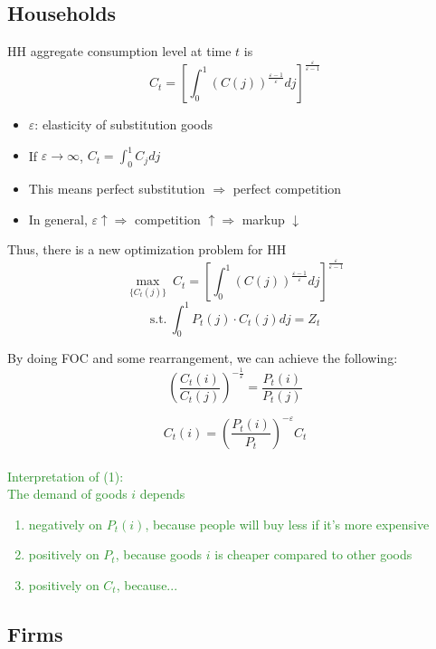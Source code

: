 \documentclass{article}
\begin{document}
\subsection{Households}
HH aggregate consumption level at time $t$ is 
$$C_t = \left [\int_0^1 (C(j))^{\frac{\varepsilon-1}{\varepsilon}}dj \right]^{\frac{\varepsilon}{\varepsilon - 1}}$$

\begin{itemize}
    \item $\varepsilon$: elasticity of substitution goods
    \item If $\varepsilon \rightarrow \infty$, $C_t = \int_0^1 C_j dj$
    \item This means perfect substitution $\Rightarrow$ perfect competition
    \item In general, $\varepsilon \uparrow \Rightarrow $ competition $\uparrow \Rightarrow$ markup $\downarrow$
\end{itemize}

Thus, there is a new optimization problem for HH
$$\max_{\{C_t(j)\}}\ C_t = \left [\int_0^1 (C(j))^{\frac{\varepsilon-1}{\varepsilon}}dj \right]^{\frac{\varepsilon}{\varepsilon - 1}}$$
$${\text{s.t.}}\ \int_0^1 P_t(j)\cdot C_t(j) dj = Z_t$$

By doing FOC and some rearrangement, we can achieve the following:
$$\left(\frac{C_t(i)}{C_t(j)}\right)^{-\frac{1}{\varepsilon}} = \frac{P_t(i)}{P_t(j)}$$

\begin{equation}
    C_t(i) = \left(\frac{P_t(i)}{P_t}\right)^{-\varepsilon} C_t
\end{equation}
\\
\textcolor{ForestGreen}{Interpretation of (1):}\\
\textcolor{ForestGreen}{The demand of goods $i$ depends}
\textcolor{ForestGreen}{
\begin{enumerate}
    \item negatively on $P_t(i)$, because people will buy less if it's more expensive
    \item positively on $P_t$, because goods $i$ is cheaper compared to other goods
    \item positively on $C_t$, because...\\
\end{enumerate}
}

\subsection{Firms}
\end{document}
